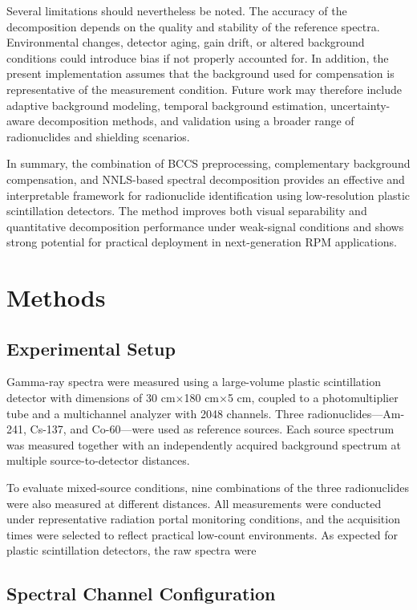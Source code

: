 \documentclass[fleqn, 10pt]{wlscirep}
\begin{document}
Several limitations should nevertheless be noted. The accuracy of the decomposition depends on the quality and stability of the reference spectra. Environmental changes, detector aging, gain drift, or altered background conditions could introduce bias if not properly accounted for. In addition, the present implementation assumes that the background used for compensation is representative of the measurement condition. Future work may therefore include adaptive background modeling, temporal background estimation, uncertainty-aware decomposition methods, and validation using a broader range of radionuclides and shielding scenarios.

In summary, the combination of BCCS preprocessing, complementary background compensation, and NNLS-based spectral decomposition provides an effective and interpretable framework for radionuclide identification using low-resolution plastic scintillation detectors. The method improves both visual separability and quantitative decomposition performance under weak-signal conditions and shows strong potential for practical deployment in next-generation RPM applications.


\section*{Methods}
\subsection*{Experimental Setup}

Gamma-ray spectra were measured using a large-volume plastic scintillation detector with dimensions of 30 cm$\times$180 cm$\times$5 cm, coupled to a photomultiplier tube and a multichannel analyzer with 2048 channels. Three radionuclides—Am-241, Cs-137, and Co-60—were used as reference sources. Each source spectrum was measured together with an independently acquired background spectrum at multiple source-to-detector distances.

To evaluate mixed-source conditions, nine combinations of the three radionuclides were also measured at different distances. All measurements were conducted under representative radiation portal monitoring conditions, and the acquisition times were selected to reflect practical low-count environments. As expected for plastic scintillation detectors, the raw spectra were


\subsection*{Spectral Channel Configuration}
\end{document}
